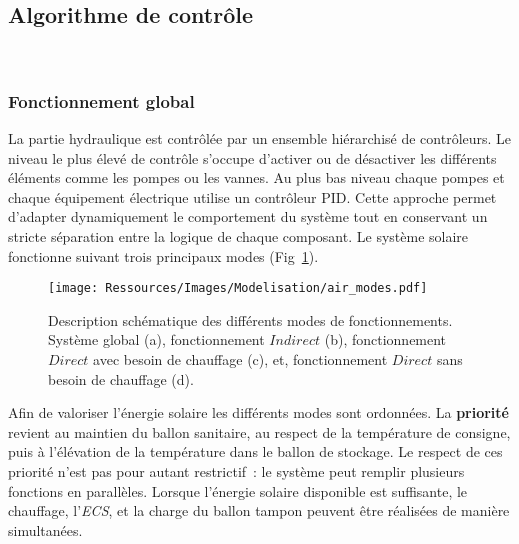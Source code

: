 \subsection{Algorithme de contrôle} %
\label{sub:algorithme_de_controle}
~

\subsubsection{Fonctionnement global} %
\label{ssub:fonctionnement_global}
La partie hydraulique est contrôlée par un ensemble hiérarchisé de contrôleurs. Le niveau
le plus élevé de contrôle s’occupe d’activer ou de désactiver les différents éléments
comme les pompes ou les vannes. Au plus bas niveau chaque pompes et chaque équipement
électrique utilise un contrôleur PID. Cette approche permet d’adapter dynamiquement le
comportement du système tout en conservant un stricte séparation entre la logique de
chaque composant. Le système solaire fonctionne suivant trois principaux modes
(Fig~\ref{fig:schema_modes}).
\begin{figure}
    \begin{center}
        \texttt{[image: Ressources/Images/Modelisation/air\_modes.pdf]}
    \end{center}
    \caption{Description schématique des différents modes de fonctionnements. Système
    global (a), fonctionnement $Indirect$ (b), fonctionnement $Direct$ avec besoin de
    chauffage (c), et, fonctionnement $Direct$ sans besoin de chauffage (d).
             \label{fig:schema_modes}}
\end{figure}

Afin de valoriser l’énergie solaire les différents modes sont ordonnées. La \textbf{priorité} revient au maintien du ballon
sanitaire, au respect de la température de consigne, puis à l’élévation de la température
dans le ballon de stockage. Le respect de ces priorité n’est pas pour autant restrictif~:
le système peut remplir plusieurs fonctions en parallèles. Lorsque l’énergie solaire
disponible est suffisante, le chauffage, l’\emph{ECS}, et la charge du ballon tampon
peuvent être réalisées de manière simultanées.

